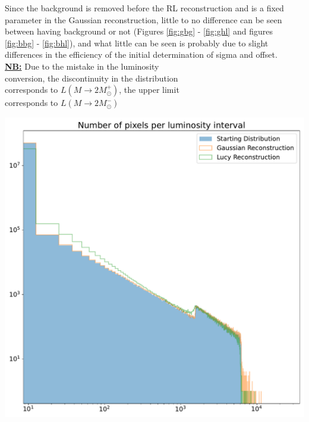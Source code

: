 \documentclass[a4paper]{article}
\newenvironment{Figure}
	{\par\medskip\noindent\minipage{\linewidth}}
	{\endminipage\par\medskip}
\begin{document}
\begin{multicols}{2}
			Since the background is removed before the RL reconstruction and is a fixed parameter in the Gaussian reconstruction, little to no difference can be seen between having background or not (Figures \ref{fig:gbg} - \ref{fig:ghl} and figures \ref{fig:bbg} - \ref{fig:bhl}), and what little can be seen is probably due to slight differences in the efficiency of the initial determination of sigma and offset.\\
			\newline
			\newline
			\newline
			\underline{\textbf{NB:}} Due to the mistake in the luminosity\\
			\indent\indent conversion, the discontinuity in the distribution\\
			\indent\indent corresponds to $L(M \rightarrow 2M_{\odot}^+)$, the upper limit\\
			\indent\indent corresponds to $L(M \rightarrow 2M_{\odot}^-)$\\
			
			\begin{Figure}
				\centering
				\includegraphics[width=\linewidth]{gauss2_lumin.pdf}
				\label{fig:gl}
			\end{Figure}
			

\end{multicols}
\end{document}

